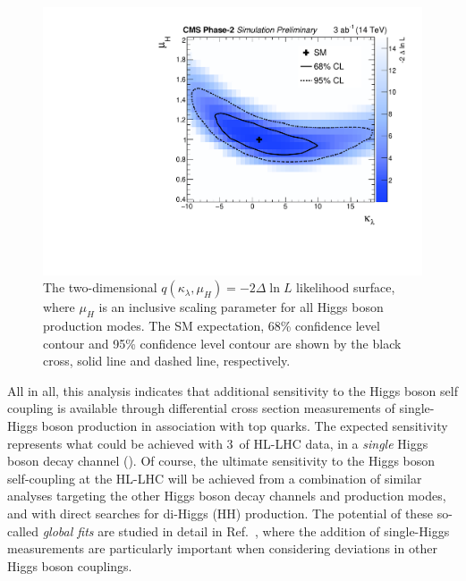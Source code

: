 \begin{figure}[htb!]
  \centering
  \includegraphics[width=.6\textwidth]{Figures/cms/trilinear/CMS-PAS-FTR-18-020_Figure_008.pdf}
  \caption[Two dimensional likelihood scan in $\kappa_\lambda$-vs-$\mu_H$]
  {
    The two-dimensional $q(\kappa_\lambda,\mu_H)=-2\Delta \ln L$ likelihood surface, where $\mu_H$ is an inclusive scaling parameter for all Higgs boson production modes. The SM expectation, 68\%  confidence level contour and 95\% confidence level contour are shown by the black cross, solid line and dashed line, respectively.
  }
  \label{fig:trilinear_2d}
\end{figure}

All in all, this analysis indicates that additional sensitivity to the Higgs boson self coupling is available through differential cross section measurements of single-Higgs boson production in association with top quarks. The expected sensitivity represents what could be achieved with 3~\abinv of HL-LHC data, in a \textit{single} Higgs boson decay channel (\Hgg). Of course, the ultimate sensitivity to the Higgs boson self-coupling at the HL-LHC will be achieved from a combination of similar analyses targeting the other Higgs boson decay channels and production modes, and with direct searches for di-Higgs (HH) production. The potential of these so-called \textit{global fits} are studied in detail in Ref.~\cite{DiVita:2017eyz}, where the addition of single-Higgs measurements are particularly important when considering deviations in other Higgs boson couplings.

